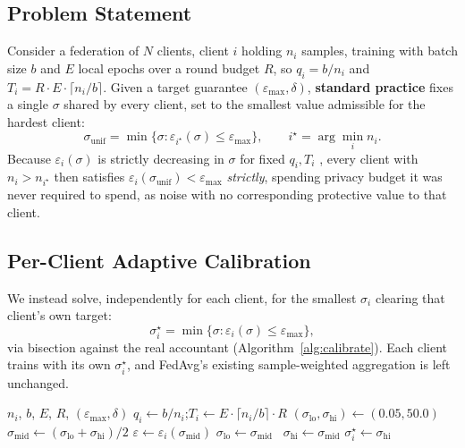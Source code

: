 \documentclass[journal]{IEEEtran}
\begin{document}
\subsection{Problem Statement}
Consider a federation of $N$ clients, client $i$ holding $n_i$
samples, training with batch size $b$ and $E$ local epochs over a
round budget $R$, so $q_i = b/n_i$ and
$T_i = R\cdot E\cdot\lceil n_i/b\rceil$. Given a target guarantee
$(\varepsilon_{\max},\delta)$, \textbf{standard practice} fixes a single
$\sigma$ shared by every client, set to the smallest value admissible
for the hardest client:
\begin{equation}
\sigma_{\mathrm{unif}} = \min\{\sigma : \varepsilon_{i^\star}(\sigma) \le \varepsilon_{\max}\},\qquad i^\star = \arg\min_i n_i.
\label{eq:sigma-unif}
\end{equation}
Because $\varepsilon_i(\sigma)$ is strictly decreasing in $\sigma$ for
fixed $q_i, T_i$ \cite{abadi2016}, every client with $n_i>n_{i^\star}$
then satisfies $\varepsilon_i(\sigma_{\mathrm{unif}}) < \varepsilon_{\max}$
\emph{strictly}, spending privacy budget it was never required to
spend, as noise with no corresponding protective value to that client.

\subsection{Per-Client Adaptive Calibration}
We instead solve, independently for each client, for the smallest
$\sigma_i$ clearing that client's own target:
\begin{equation}
\sigma_i^\star = \min\{\sigma : \varepsilon_i(\sigma) \le \varepsilon_{\max}\},
\label{eq:sigma-adaptive}
\end{equation}
via bisection against the real accountant (Algorithm~\ref{alg:calibrate}).
Each client trains with its own $\sigma_i^\star$, and FedAvg's
existing sample-weighted aggregation is left unchanged.

\begin{algorithm}[t]
\caption{Per-client $\sigma$ calibration}
\label{alg:calibrate}
\begin{algorithmic}[1]
\Require $n_i$, $b$, $E$, $R$, $(\varepsilon_{\max},\delta)$
\State $q_i \gets b / n_i$;\quad $T_i \gets E \cdot \lceil n_i / b \rceil \cdot R$
\State $(\sigma_{\text{lo}}, \sigma_{\text{hi}}) \gets (0.05, 50.0)$
  \State $\sigma_{\text{mid}} \gets (\sigma_{\text{lo}}+\sigma_{\text{hi}})/2$
  \State $\varepsilon \gets \varepsilon_i(\sigma_{\text{mid}})$ 
  \If{$\varepsilon > \varepsilon_{\max}$} $\sigma_{\text{lo}} \gets \sigma_{\text{mid}}$
  \Else\ $\sigma_{\text{hi}} \gets \sigma_{\text{mid}}$
  \EndIf
\EndWhile
\State \Return $\sigma_i^\star \gets \sigma_{\text{hi}}$
\end{algorithmic}
\end{algorithm}
\end{document}
